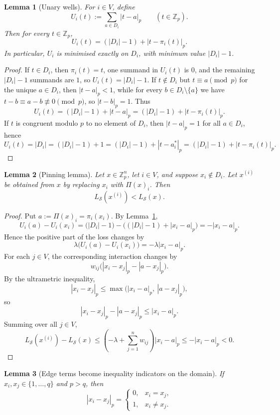 \documentclass[11pt]{article}
\newtheorem{lemma}{Lemma}
\begin{document}
\begin{lemma}[Unary wells]
\label{lem:unary-well}
For \(i\in V\), define
\[
U_i(t):=\sum_{a\in D_i}|t-a|_p
\qquad (t\in\mathbb Z_p).
\]
Then for every \(t\in\mathbb Z_p\),
\[
U_i(t)=(|D_i|-1)+|t-\pi_i(t)|_p.
\]
In particular, \(U_i\) is minimised exactly on \(D_i\), with minimum value \(|D_i|-1\).
\end{lemma}

\begin{proof}
If \(t\in D_i\), then \(\pi_i(t)=t\), one summand in \(U_i(t)\) is \(0\), and the remaining \(|D_i|-1\) summands are \(1\), so \(U_i(t)=|D_i|-1\). If \(t\notin D_i\) but \(t\equiv a \pmod p\) for the unique \(a\in D_i\), then \(|t-a|_p<1\), while for every \(b\in D_i\setminus\{a\}\) we have \(t-b\equiv a-b\not\equiv 0\pmod p\), so \(|t-b|_p=1\). Thus
\[
U_i(t)=(|D_i|-1)+|t-a|_p=(|D_i|-1)+|t-\pi_i(t)|_p.
\]
If \(t\) is congruent modulo \(p\) to no element of \(D_i\), then \(|t-a|_p=1\) for all \(a\in D_i\), hence
\[
U_i(t)=|D_i|=(|D_i|-1)+1=(|D_i|-1)+|t-a_i^\ast|_p=(|D_i|-1)+|t-\pi_i(t)|_p.
\]
\end{proof}

\begin{lemma}[Pinning lemma]
\label{lem:pinning}
Let \(x\in\mathbb Z_p^n\), let \(i\in V\), and suppose \(x_i\notin D_i\). Let \(x^{(i)}\) be obtained from \(x\) by replacing \(x_i\) with \(\Pi(x)_i\). Then
\[
L_{\mathcal S}(x^{(i)})<L_{\mathcal S}(x).
\]
\end{lemma}

\begin{proof}
Put \(a:=\Pi(x)_i=\pi_i(x_i)\). By Lemma~\ref{lem:unary-well},
\[
U_i(a)-U_i(x_i)=\bigl(|D_i|-1\bigr)-\bigl((|D_i|-1)+|x_i-a|_p\bigr)=-|x_i-a|_p.
\]
Hence the positive part of the loss changes by
\[
\lambda\bigl(U_i(a)-U_i(x_i)\bigr)=-\lambda |x_i-a|_p.
\]
For each \(j\in V\), the corresponding interaction changes by
\[
w_{ij}\bigl(|x_i-x_j|_p-|a-x_j|_p\bigr).
\]
By the ultrametric inequality,
\[
|x_i-x_j|_p \le \max\bigl(|x_i-a|_p,\ |a-x_j|_p\bigr),
\]
so
\[
|x_i-x_j|_p-|a-x_j|_p \le |x_i-a|_p.
\]
Summing over all \(j\in V\),
\[
L_{\mathcal S}(x^{(i)})-L_{\mathcal S}(x)
\le
\left(-\lambda+\sum_{j=1}^n w_{ij}\right)|x_i-a|_p
\le
-|x_i-a|_p
<
0.
\]
\end{proof}

\begin{lemma}[Edge terms become inequality indicators on the domain]
\label{lem:edge-indicator}
If \(x_i,x_j\in \{1,\dots,q\}\) and \(p>q\), then
\[
|x_i-x_j|_p=
\begin{cases}
0,&x_i=x_j,\\
1,&x_i\neq x_j.
\end{cases}
\]
\end{lemma}
\end{document}
